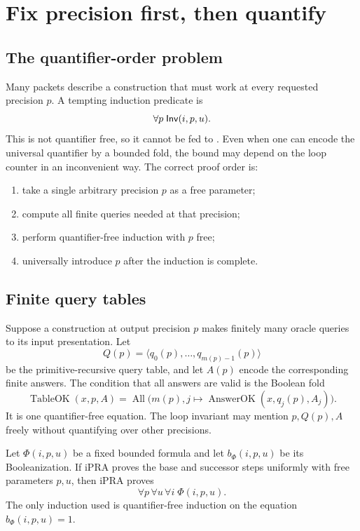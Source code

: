 \section{Fix precision first, then quantify}
\label{sec:fixedprecision}

\subsection{The quantifier-order problem}

Many packets describe a construction that must work at every requested
precision \(p\).  A tempting induction predicate is
\[
   \forall p\;\mathsf{Inv}(i,p,u).
\]
This is not quantifier free, so it cannot be fed to .  Even when
one can encode the universal quantifier by a bounded fold, the bound may depend
on the loop counter in an inconvenient way.  The correct proof order is:
\begin{enumerate}
\item take a single arbitrary precision \(p\) as a free parameter;
\item compute all finite queries needed at that precision;
\item perform quantifier-free induction with \(p\) free;
\item universally introduce \(p\) after the induction is complete.
\end{enumerate}

\subsection{Finite query tables}

Suppose a construction at output precision \(p\) makes finitely many oracle
queries to its input presentation.  Let
\[
   Q(p)=\langle q_0(p),\ldots,q_{m(p)-1}(p)\rangle
\]
be the primitive-recursive query table, and let
\(A(p)\) encode the corresponding finite answers.  The condition that all
answers are valid is the Boolean fold
\[
   \operatorname{TableOK}(x,p,A)
   =\operatorname{All}\bigl(m(p),
       j\mapsto \operatorname{AnswerOK}(x,q_j(p),A_j)\bigr).
\]
It is one quantifier-free equation.  The loop invariant may mention \(p,Q(p),A\)
freely without quantifying over other precisions.

\begin{theorem}
Let \(\Phi(i,p,u)\) be a fixed bounded formula and let
\(b_\Phi(i,p,u)\) be its Booleanization.  If iPRA proves the base and successor
steps uniformly with free parameters \(p,u\), then iPRA proves
\[
      \forall p\,\forall u\,\forall i\;\Phi(i,p,u).
\]
The only induction used is quantifier-free induction on the equation
\(b_\Phi(i,p,u)=1\).
\end{theorem}

